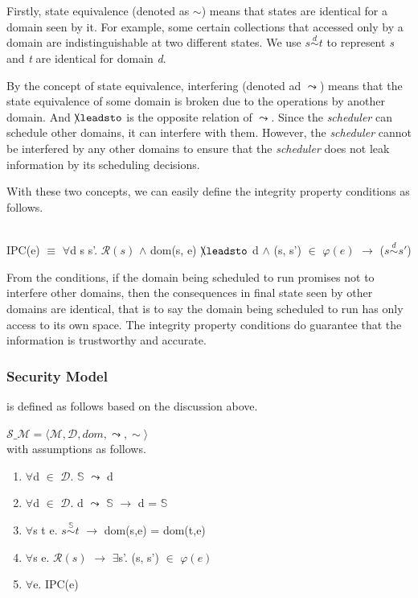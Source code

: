 \documentclass[runningheads]{llncs}
\makeatletter
\newcommand{\equidom}[3]{{#1}\stackrel{#2}{\sim}{#3}}
\newcommand{\superimpose}[2]
	{{\ooalign{$#1\@firstoftwo#2$\cr\hfil$#1\@secondoftwo#2$\hfil\cr}}}
\newcommand{\interf}{\leadsto}
\newcommand{\ninterf}{\mathrel{\mathpalette\superimpose{{\slash}{\leadsto}}}}
\makeatother
\begin{document}
Firstly, state equivalence (denoted as $\sim$) means that states are identical for a domain seen by it. For example, some certain collections that accessed only by a domain are indistinguishable at two different states. We use $\equidom{s}{d}{t}$ to represent \emph{s} and \emph{t} are identical for domain \emph{d}.

By the concept of state equivalence, interfering (denoted ad $\interf$) means that the state equivalence of some domain is broken due to the operations by another domain. And $\ninterf$ is the opposite relation of $\interf$. Since the \emph{scheduler} can schedule other domains, it can interfere with them. However, the \emph{scheduler} cannot be interfered by any other domains to ensure that the \emph{scheduler} does not leak information by its scheduling decisions.

With these two concepts, we can easily define the integrity property conditions as follows.

\begin{definition}  \\
IPC(e) $\equiv$ $\forall$d s s'. $\mathcal{R}(s)$ $\wedge$ dom(s, e) $\ninterf$ d $\wedge$ (s, s') $\in$ $\varphi(e)$ $\longrightarrow$ ($\equidom{s}{d}{s'}$)
\end{definition}

From the conditions, if the domain being scheduled to run promises not to interfere other domains, then the consequences in final state seen by other domains are identical, that is to say the domain being scheduled to run has only access to its own space. The integrity property conditions do guarantee that the information is trustworthy and accurate.

\subsubsection{Security Model} is defined as follows based on the discussion above.

\begin{definition}  $\mathcal{S\_M} = \langle \mathcal{M}, \mathcal{D}, dom, \interf, \sim \rangle$ \\
with assumptions as follows.
\begin{enumerate}
\item $\forall$d $\in$ $\mathcal{D}$. $\mathbb{S}$ $\interf$ d
\item $\forall$d $\in$ $\mathcal{D}$. d $\interf$ $\mathbb{S}$ $\longrightarrow$ d = $\mathbb{S}$
\item $\forall$s t e. $\equidom{s}{\mathbb{S}}{t}$ $\longrightarrow$ dom(s,e) = dom(t,e)
\item $\forall$s e. $\mathcal{R}(s)$ $\longrightarrow$ $\exists$s'. (s, s') $\in$ $\varphi(e)$
\item $\forall$e. IPC(e)
\end{enumerate}
\end{definition}
\end{document}
